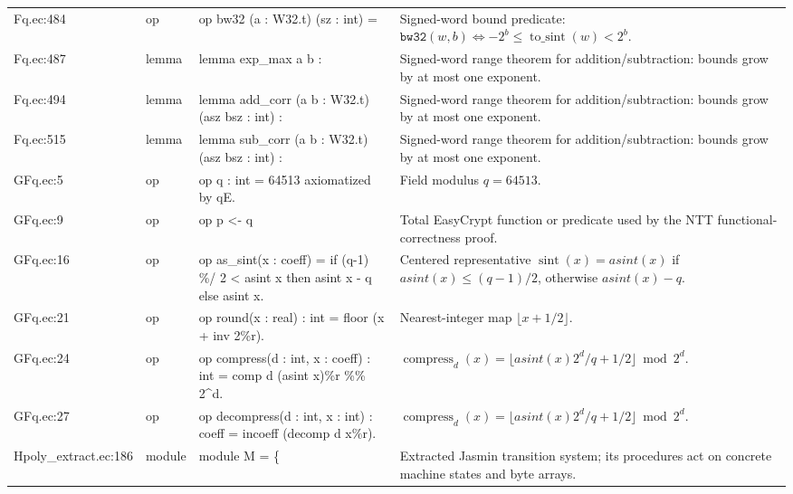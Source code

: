 \documentclass[10pt]{article}
\begin{document}
\begin{longtable}{L{0.11\textwidth}L{0.05\textwidth}L{0.38\textwidth}L{0.42\textwidth}}
Fq.\allowbreak{}ec:\allowbreak{}484 & op & {\ttfamily\scriptsize op bw32 (a : W32.t) (sz : int) =} & Signed-word bound predicate: $\mathtt{bw32}(w,b)\iff -2^b\le \operatorname{to\_sint}(w)<2^b$. \\
Fq.\allowbreak{}ec:\allowbreak{}487 & lemma & {\ttfamily\scriptsize lemma exp\_max a b :} & Signed-word range theorem for addition/subtraction: bounds grow by at most one exponent. \\
Fq.\allowbreak{}ec:\allowbreak{}494 & lemma & {\ttfamily\scriptsize lemma add\_corr (a b : W32.t) (asz bsz : int) :} & Signed-word range theorem for addition/subtraction: bounds grow by at most one exponent. \\
Fq.\allowbreak{}ec:\allowbreak{}515 & lemma & {\ttfamily\scriptsize lemma sub\_corr (a b : W32.t) (asz bsz : int) :} & Signed-word range theorem for addition/subtraction: bounds grow by at most one exponent. \\
GFq.\allowbreak{}ec:\allowbreak{}5 & op & {\ttfamily\scriptsize op q : int = 64513 axiomatized by qE.} & Field modulus $q=64513$. \\
GFq.\allowbreak{}ec:\allowbreak{}9 & op & {\ttfamily\scriptsize op p <- q} & Total EasyCrypt function or predicate used by the NTT functional-correctness proof. \\
GFq.\allowbreak{}ec:\allowbreak{}16 & op & {\ttfamily\scriptsize op as\_sint(x : coeff) = if (q-1) \%/ 2 < asint x then asint x - q else asint x.} & Centered representative $\operatorname{sint}(x)=asint(x)$ if $asint(x)\le(q-1)/2$, otherwise $asint(x)-q$. \\
GFq.\allowbreak{}ec:\allowbreak{}21 & op & {\ttfamily\scriptsize op round(x : real) : int = floor (x + inv 2\%r).} & Nearest-integer map $\lfloor x+1/2\rfloor$. \\
GFq.\allowbreak{}ec:\allowbreak{}24 & op & {\ttfamily\scriptsize op compress(d : int, x : coeff) : int = comp d (asint x)\%r \%\% 2\textasciicircum{}d.} & $\operatorname{compress}_d(x)=\lfloor asint(x)2^d/q+1/2\rfloor\bmod 2^d$. \\
GFq.\allowbreak{}ec:\allowbreak{}27 & op & {\ttfamily\scriptsize op decompress(d : int, x : int) : coeff = incoeff (decomp d x\%r).} & $\operatorname{compress}_d(x)=\lfloor asint(x)2^d/q+1/2\rfloor\bmod 2^d$. \\
Hpoly\_extract.\allowbreak{}ec:\allowbreak{}186 & module & {\ttfamily\scriptsize module M = \{} & Extracted Jasmin transition system; its procedures act on concrete machine states and byte arrays. \\

\end{longtable}
\end{document}
